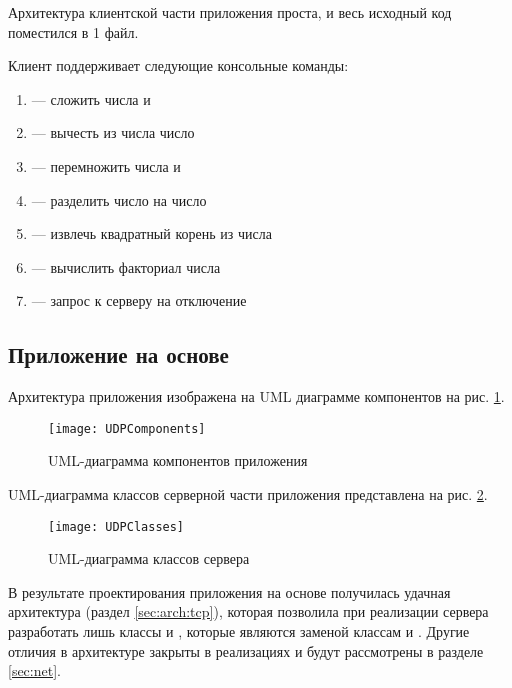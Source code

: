 Архитектура клиентской части приложения проста, и весь исходный код поместился в 1 файл.

Клиент поддерживает следующие консольные команды:

\begin{enumerate}
	\item {} --- сложить числа  и 
	\item {} --- вычесть из числа  число 
	\item {} --- перемножить числа  и 
	\item {} --- разделить число  на число 
	\item {} --- извлечь квадратный корень из числа 
	\item {} --- вычислить факториал числа 
	\item {} --- запрос к серверу на отключение
\end{enumerate}

\subsection{Приложение на основе }\label{subsec:arch-udp}

Архитектура приложения изображена на UML диаграмме компонентов на рис. \ref{fig:udp-comp}.

\begin{figure}[H]
	\centering
	\texttt{[image: UDPComponents]}
	\caption{UML-диаграмма компонентов  приложения}
	\label{fig:udp-comp}
\end{figure}

UML-диаграмма классов серверной части приложения представлена на рис. \ref{fig:udp-classes}.

\begin{figure}[H]
	\centering
	\texttt{[image: UDPClasses]}
	\caption{UML-диаграмма классов  сервера}
	\label{fig:udp-classes}
\end{figure}

В результате проектирования приложения на основе  получилась удачная архитектура (раздел \ref{sec:arch:tcp}), которая позволила при реализации  сервера разработать лишь классы  и , которые являются заменой классам  и . Другие отличия в архитектуре закрыты в реализациях  и будут рассмотрены в разделе \ref{sec:net}.\\[3mm]

